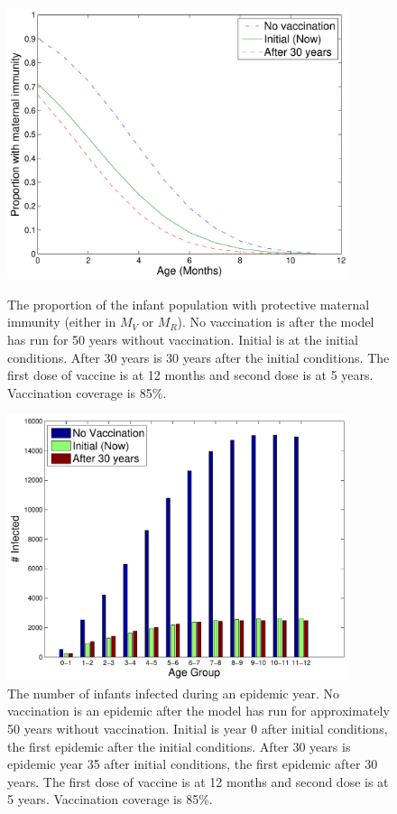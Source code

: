 \documentclass[a4paper,11pt] {scrartcl}
\begin{document}
\begin{figure}[hp]
	\centering
	\includegraphics[width=100mm]{maternalimmunitymeaslesnowaningdouble85}
	\caption{The proportion of the infant population with protective maternal immunity (either in $M_V$ or $M_R$). No vaccination is after the model has run for 50 years without vaccination. Initial is at the initial conditions. After 30 years is 30 years after the initial conditions. The first dose of vaccine is at 12 months and second dose is at 5 years. Vaccination coverage is 85\%.}
	\label{fig:resultsmaternalimmunitymeaslesnowaningdouble85}
	
	\includegraphics[width=100mm]{infectionininfantsnowanedouble85}
	\caption{The number of infants infected during an epidemic year. No vaccination is an epidemic after the model has run for approximately 50 years without vaccination. Initial is year 0 after initial conditions, the first epidemic after the initial conditions. After 30 years is epidemic year 35 after initial conditions, the first epidemic after 30 years. The first dose of vaccine is at 12 months and second dose is at 5 years. Vaccination coverage is 85\%.}
	\label{fig:resultsinfectionininfantsnowanedouble85}
\end{figure}
\end{document}
